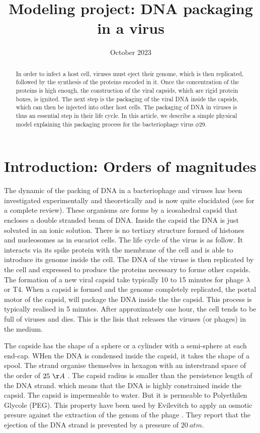 \documentclass{article}
\title{Modeling project: DNA packaging in a virus}
\author{}
\date{October 2023}
\begin{document}
\maketitle

\begin{abstract}
\noindent
In order to infect a host cell, viruses must eject their genome, which is then replicated, followed by the synthesis of the proteins encoded in it. Once the concentration of the proteins is high enough, the construction of the viral capsids, which are rigid protein boxes, is ignited. The next step is the packaging of the viral DNA inside the capsids, which can then be injected into other host cells. The packaging of DNA in viruses is thus an essential step in their life cycle. In this article, we describe a simple physical model explaining this packaging process for the bacteriophage virus $\phi 29$. 
\end{abstract}


\section{Introduction: Orders of magnitudes}
The dynamic of the packing of DNA in a bacteriophage and viruses has been investigated experimentally and theoretically and is now quite elucidated (see \cite{phillips2005} for a complete review). These organisms are forms by a icosahedral capsid that encloses a double stranded beam of DNA. Inside the capsid the DNA is just solvated in an ionic solution. There is no tertiary structure formed of histones and nucleosomes as in eucariot cells. The life cycle of the virus is as follow. It interacts via its spike protein with the membrane of the cell and is able to introduce its genome inside the cell. The DNA of the viruse is then replicated by the cell and expressed to produce the proteins necessary to forme other capsids. The formation of a new viral capsid take typically 10 to 15 minutes for phage $\lambda$ or T4. When a capsid is formed and the genome completely replicated, the portal motor of the capsid, will package the DNA inside the the capsid. This process is typically realised in 5 minutes. After approximately one hour, the cell tends to be full of viruses and dies. This is the lisis that releases the viruses (or phages) in the medium.

The capside has the shape of a sphere or a cylinder with a semi-sphere at each end-cap. WHen the DNA is condensed inside the capsid, it takes the shape of a spool. The strand organise themselves in hexagon with an interstrand space of the order of $25~\AA$ \cite{earnshaw1977}. The capsid radius is smaller than the persistence length of the DNA strand. which means that the DNA is highly constrained inside the capsid. The capsid is impermeable to water. But it is permeable to Polyethilen Glycole (PEG). This property have been used by Evilevitch to apply an osmotic presure against the extraction of the genom of the phage \cite{evilevitch2003}. They report that the ejection of the DNA strand is prevented by a pressure of $20~atm.$
\end{document}
